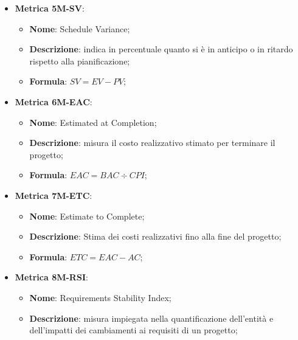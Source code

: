 \begin{itemize}
    \item \textbf{Metrica 5M-SV}:
    \begin{itemize}
        \item \textbf{Nome}: Schedule Variance;
        \item \textbf{Descrizione}: indica in percentuale quanto si è in anticipo o in ritardo rispetto alla pianificazione;
        \item \textbf{Formula}: $SV = EV - PV$;
    \end{itemize}
\end{itemize}

\begin{itemize}
    \item \textbf{Metrica 6M-EAC}:
    \begin{itemize}
        \item \textbf{Nome}: Estimated at Completion;
        \item \textbf{Descrizione}: misura il costo realizzativo stimato per terminare il progetto;
        \item \textbf{Formula}: $EAC = BAC \div CPI$;
    \end{itemize}
\end{itemize}

\begin{itemize}
    \item \textbf{Metrica 7M-ETC}:
    \begin{itemize}
        \item \textbf{Nome}: Estimate to Complete;
        \item \textbf{Descrizione}: Stima dei costi realizzativi fino alla fine del progetto;
        \item \textbf{Formula}: $ETC = EAC - AC$;
    \end{itemize}
\end{itemize}

\begin{itemize}
    \item \textbf{Metrica 8M-RSI}:
    \begin{itemize}
        \item \textbf{Nome}: Requirements Stability Index;
        \item \textbf{Descrizione}: misura impiegata nella quantificazione dell'entità e dell'impatti dei cambiamenti ai requisiti di un progetto;
    \end{itemize}
\end{itemize}

